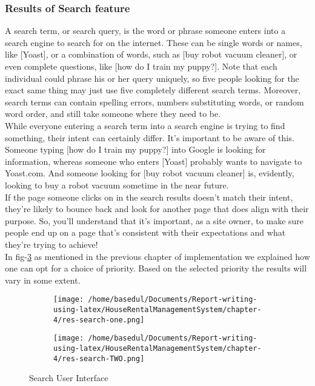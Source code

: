 \documentclass[12pt,a4paper]{article}
\newcommand\tab[1][.7cm]{\hspace*{#1}}
\begin{document}
	\subsubsection{Results of Search feature}
	\tab A search term\cite{Ref:18}, or search query, is the word or phrase someone enters into a search engine to search for on the internet. These can be single words or names, like [Yoast], or a combination of words, such as [buy robot vacuum cleaner], or even complete questions, like [how do I train my puppy?]. Note that each individual could phrase his or her query uniquely, so five people looking for the exact same thing may just use five completely different search terms. Moreover, search terms can contain spelling errors, numbers substituting words, or random word order, and still take someone where they need to be.\\While everyone entering a search term into a search engine is trying to find something, their intent can certainly differ. It’s important to be aware of this. Someone typing [how do I train my puppy?] into Google is looking for information, whereas someone who enters [Yoast] probably wants to navigate to Yoast.com. And someone looking for [buy robot vacuum cleaner] is, evidently, looking to buy a robot vacuum sometime in the near future.\\If the page someone clicks on in the search results doesn’t match their intent, they’re likely to bounce back and look for another page that does align with their purpose. So, you’ll understand that it’s important, as a site owner, to make sure people end up on a page that’s consistent with their expectations and what they’re trying to achieve!\\In fig-\ref{fig:search} as mentioned in the previous chapter of implementation we explained how one can opt for a choice of
priority. Based on the selected priority the results will vary in some extent.
\begin{figure}[H]
 \centering
\begin{subfigure}{0.5\textwidth}
\texttt{[image: /home/basedul/Documents/Report-writing-using-latex/HouseRentalManagementSystem/chapter-4/res-search-one.png]} 
\label{fig:search1}
\end{subfigure}
\begin{subfigure}{0.5\textwidth}
\texttt{[image: /home/basedul/Documents/Report-writing-using-latex/HouseRentalManagementSystem/chapter-4/res-search-TWO.png]}
\label{fig:hyuuua}
\end{subfigure}
 
\caption{Search User Interface}
\label{fig:search}
\end{figure}
\end{document}
